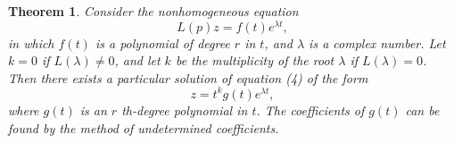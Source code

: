\documentclass[10pt,a5paper]{book}
\theoremstyle{plain}
\newtheorem{theorem}{Theorem}
\theoremstyle{definition}
\theoremstyle{remark}
\begin{document}
\begin{theorem}
Consider the nonhomogeneous equation
\begin{equation*}
L(p) z=f(t) e^{\lambda t}, \tag{4}
\end{equation*}
in which $f(t)$ is a polynomial of degree $r$ in $t$, and $\lambda$ is a complex number. Let $k=0$ if $L(\lambda) \neq 0$, and let $k$ be the multiplicity of the root $\lambda$ if $L(\lambda)=0$. Then there exists a particular solution of equation (4) of the form
\begin{equation*}
z=t^{k} g(t) e^{\lambda t}, \tag{5}
\end{equation*}
where $g(t)$ is an $r$ th-degree polynomial in $t$. The coefficients of $g(t)$ can be found by the method of undetermined coefficients.
\end{theorem}
\end{document}
